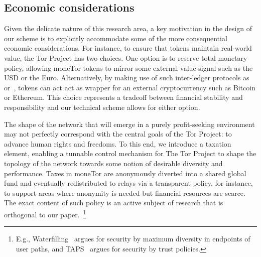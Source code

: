 
\subsection{Economic considerations}



Given the delicate nature of this research area, a key motivation in
the design of our scheme is to explicitly accommodate some of the more
consequential economic considerations. For instance, to ensure that
tokens maintain real-world value, the Tor Project has two 
choices. One option is to reserve total monetary policy, allowing
moneTor tokens to mirror some external value signal such as the USD or
the Euro. Alternatively, by making use of such inter-ledger protocols
as~\cite{back2014enabling} or~\cite{poon2017plasma}, tokens can act act
as wrapper for an external cryptocurrency such as Bitcoin or
Ethereum. This choice represents a tradeoff between financial
stability and responsibility and our technical scheme allows for
either option.

The shape of the network that will emerge in a purely profit-seeking
environment may not perfectly correspond with the central goals of the
Tor Project: to advance human rights and freedoms. To this end, we
introduce a taxation element, enabling a tunnable control mechanism
for The Tor Project to shape the topology of the network towards some
notion of desirable diversity and performance. Taxes in moneTor are
anonymously diverted into a shared global fund and eventually
redistributed to relays via a transparent policy, for instance, to
support areas where anonymity is needed but financial resources are
scarce. The exact content of such policy is an active subject of
research that is orthogonal to our paper.~\footnote{E.g.,
  Waterfilling~\cite{waterfilling-pets2017} argues for security by
  maximum diversity in endpoints of user paths, and
  TAPS~\cite{taps-ndss2017} argues for security by trust policies.}

